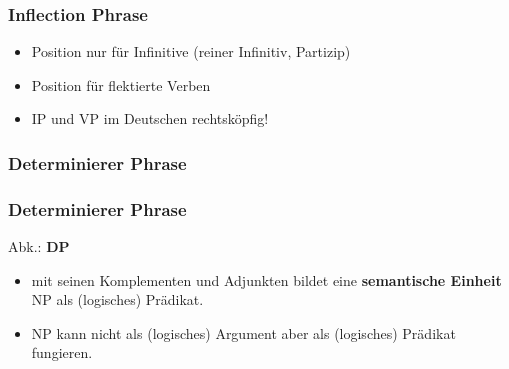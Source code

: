 \begin{frame}
\frametitle{Inflection Phrase}

	\begin{itemize}
		\item {} \ras Position nur für Infinitive (reiner Infinitiv, Partizip)
		\item {} \ras Position für flektierte Verben
		\item IP und VP im Deutschen \ras rechtsköpfig!		
	\end{itemize}


\begin{minipage}[b]{0.48\textwidth}
	\centering
\end{minipage}  
%
%          
\begin{minipage}[b]{0.48\textwidth}
	\centering
 \end{minipage}  

\end{frame}


\subsubsection{Determinierer Phrase}

\begin{frame}
\frametitle{Determinierer Phrase}

Abk.: \textbf{DP} 

\begin{itemize}
	\item {} mit seinen Komplementen und Adjunkten bildet eine \textbf{semantische Einheit} \ras NP als (logisches) Prädikat.
	\item NP kann nicht als (logisches) Argument aber als (logisches) Prädikat fungieren.
	\eal 
	\zl

\end{itemize}	

\nocite{MyP16b} \nocite{MyP16c}

\end{frame}

